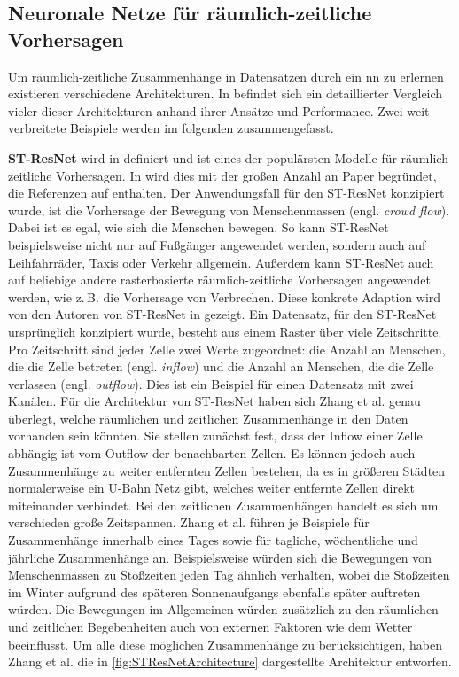 \subsection{Neuronale Netze für räumlich-zeitliche Vorhersagen}
\label{sec:STNNs}

Um räumlich-zeitliche Zusammenhänge in Datensätzen durch ein \acrshort{nn} zu erlernen existieren verschiedene Architekturen.
In \cite{DLTraff} befindet sich ein detaillierter Vergleich vieler dieser Architekturen anhand ihrer Ansätze und Performance.
Zwei weit verbreitete Beispiele werden im folgenden zusammengefasst.

\textbf{ST-ResNet} wird in \cite{STResNetOriginal} definiert und ist eines der populärsten Modelle für räumlich-zeitliche Vorhersagen.
In \cite{DLTraff} wird dies mit der großen Anzahl an Paper begründet, die Referenzen auf \cite{STResNetOriginal} enthalten.
Der Anwendungsfall für den ST-ResNet konzipiert wurde, ist die Vorhersage der Bewegung von Menschenmassen (engl. \emph{crowd flow}).
Dabei ist es egal, wie sich die Menschen bewegen.
So kann ST-ResNet beispielsweise nicht nur auf Fußgänger angewendet werden, sondern auch auf Leihfahrräder, Taxis oder Verkehr allgemein.
Außerdem kann ST-ResNet auch auf beliebige andere rasterbasierte räumlich-zeitliche Vorhersagen angewendet werden, wie z.\,B. die Vorhersage von Verbrechen.
Diese konkrete Adaption wird von den Autoren von ST-ResNet in \cite{CrimeSTResNet} gezeigt.
Ein Datensatz, für den ST-ResNet ursprünglich konzipiert wurde, besteht aus einem Raster über viele Zeitschritte.
Pro Zeitschritt sind jeder Zelle zwei Werte zugeordnet: die Anzahl an Menschen, die die Zelle betreten (engl. \emph{inflow}) und die Anzahl an Menschen, die die Zelle verlassen (engl. \emph{outflow}).
Dies ist ein Beispiel für einen Datensatz mit zwei Kanälen.
Für die Architektur von ST-ResNet haben sich Zhang et al. genau überlegt, welche räumlichen und zeitlichen Zusammenhänge in den Daten vorhanden sein könnten.
Sie stellen zunächst fest, dass der Inflow einer Zelle abhängig ist vom Outflow der benachbarten Zellen.
Es können jedoch auch Zusammenhänge zu weiter entfernten Zellen bestehen, da es in größeren Städten normalerweise ein U-Bahn Netz gibt, welches weiter entfernte Zellen direkt miteinander verbindet.
Bei den zeitlichen Zusammenhängen handelt es sich um verschieden große Zeitspannen.
Zhang et al. führen je Beispiele für Zusammenhänge innerhalb eines Tages sowie für tagliche, wöchentliche und jährliche Zusammenhänge an.
Beispielsweise würden sich die Bewegungen von Menschenmassen zu Stoßzeiten jeden Tag ähnlich verhalten, wobei die Stoßzeiten im Winter aufgrund des späteren Sonnenaufgangs ebenfalls später auftreten würden.
Die Bewegungen im Allgemeinen würden zusätzlich zu den räumlichen und zeitlichen Begebenheiten auch von externen Faktoren wie dem Wetter beeinflusst.
Um alle diese möglichen Zusammenhänge zu berücksichtigen, haben Zhang et al. die in \autoref{fig:STResNetArchitecture} dargestellte Architektur entworfen.

